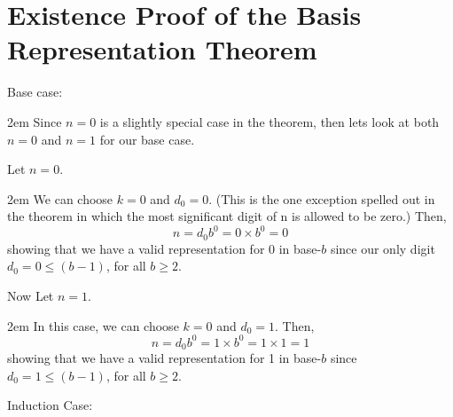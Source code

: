\documentclass{article}
\newenvironment{jprIn}{\begin{adjustwidth}{2em}{}}{\end{adjustwidth}}
\begin{document}
\section*{Existence Proof of the Basis Representation Theorem}

Base case:
\begin{jprIn}
Since $n=0$ is a slightly special case in the theorem, then lets look at both $n=0$ and $n=1$ for our base case.

Let $n=0$.

\begin{jprIn}
We can choose $k=0$ and $d_0=0$.
(This is the one exception spelled out in the theorem in
which the most significant digit of n is allowed to be zero.) Then,
\[n=d_0b^0=0\times{}b^0=0\]
showing that we have a valid representation for 0 in base-$b$ since our only digit\\
$d_0=0\le(b-1)$, for all $b\ge2$.
\end{jprIn}

Now Let $n=1$.

\begin{jprIn}
In this case, we can choose $k=0$ and $d_0=1$.  Then,
\[n=d_0b^0=1\times{}b^0=1\times{}1=1\]
showing that we have a valid representation for 1 in base-$b$ since\\
$d_0=1\le(b-1)$, for all $b\ge2$.
\end{jprIn}
\end{jprIn}
\bigskip

\break
Induction Case:
\end{document}
